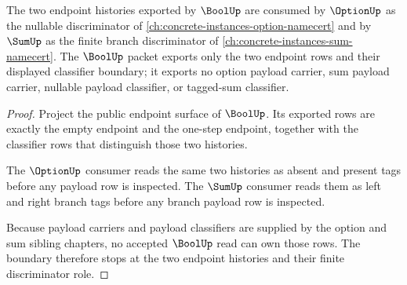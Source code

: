 \begin{theorem}
\label{thm:bool-sibling-carrier-boundary}
The two endpoint histories exported by $\BoolUp$ are consumed by $\OptionUp$ as the nullable discriminator of \autoref{ch:concrete-instances-option-namecert} and by $\SumUp$ as the finite branch discriminator of \autoref{ch:concrete-instances-sum-namecert}. The $\BoolUp$ packet exports only the two endpoint rows and their displayed classifier boundary; it exports no option payload carrier, sum payload carrier, nullable payload classifier, or tagged-sum classifier.
\end{theorem}
\begin{proof}
Project the public endpoint surface of $\BoolUp$. Its exported rows are exactly the empty endpoint and the one-step endpoint, together with the classifier rows that distinguish those two histories.

The $\OptionUp$ consumer reads the same two histories as absent and present tags before any payload row is inspected. The $\SumUp$ consumer reads them as left and right branch tags before any branch payload row is inspected.

Because payload carriers and payload classifiers are supplied by the option and sum sibling chapters, no accepted $\BoolUp$ read can own those rows. The boundary therefore stops at the two endpoint histories and their finite discriminator role.
\end{proof}
